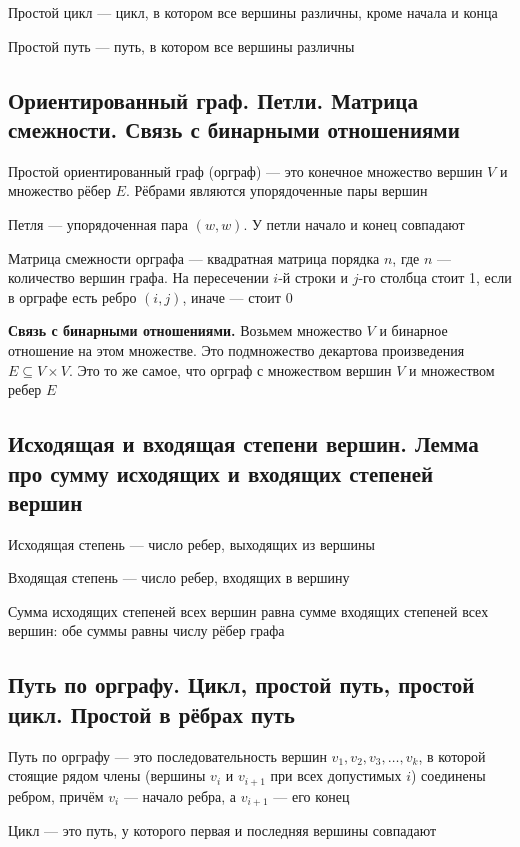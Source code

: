 \documentclass[a4paper]{article}
\begin{document}
 Простой цикл — цикл, в котором все вершины различны, кроме начала и конца

 Простой путь — путь, в котором все вершины различны

\subsection{Ориентированный граф. Петли. Матрица смежности. Связь с бинарными отношениями}
 Простой ориентированный граф (орграф) — это конечное множество вершин $V$ и множество рёбер $E$. Рёбрами являются упорядоченные пары вершин

 Петля — упорядоченная пара $(w, w)$. У петли начало и конец совпадают

 Матрица смежности орграфа — квадратная матрица порядка $n$, где $n$ — количество вершин графа. На пересечении $i$-й строки  и $j$-го столбца стоит 1, если в орграфе есть ребро $(i, j)$, иначе — стоит 0

\indent\textbf{Связь с бинарными отношениями.} Возьмем множество $V$ и бинарное отношение на этом множестве. Это подмножество декартова произведения $E\subseteq V\times V$. Это то же самое, что орграф с множеством вершин $V$ и множеством ребер $E$


\subsection{Исходящая и входящая степени вершин. Лемма про сумму исходящих и входящих степеней вершин}
 Исходящая степень — число ребер, выходящих из вершины

 Входящая степень — число ребер, входящих в вершину

\lemma Сумма исходящих степеней всех вершин равна сумме входящих степеней всех вершин: обе суммы равны числу рёбер графа


\subsection{Путь по орграфу. Цикл, простой путь, простой цикл. Простой в рёбрах путь}
 Путь по орграфу — это  последовательность вершин $v_1, v_2, v_3,\ldots, v_k$, в которой стоящие рядом члены (вершины $v_i$ и $v_{i+1}$ при всех допустимых $i$) соединены ребром, причём $v_i$ — начало ребра, а $v_{i+1}$ — его конец

 Цикл — это путь, у которого первая и последняя вершины совпадают
\end{document}
